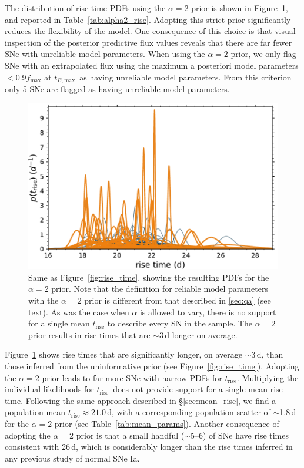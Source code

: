 \documentclass[twocolumn]{./aastex63}
\newcommand{\trise}{$t_\mathrm{rise}$}
\newcommand{\tbmax}{$t_{B,\mathrm{max}}$}
\begin{document}
The distribution of rise time PDFs using the $\alpha = 2$ prior is shown in
Figure~\ref{fig:tsquared_rise}, and reported in Table~\ref{tab:alpha2_rise}.
Adopting this strict prior significantly reduces the flexibility of the model.
One consequence of this choice is that visual inspection of the posterior
predictive flux values reveals that there are far fewer SNe with unreliable
model parameters. When using the $\alpha = 2$ prior, we only flag SNe with an
extrapolated flux using the maximum a posteriori model parameters $< 0.9
f_\mathrm{max}$ at \tbmax\ as having unreliable model parameters. From this
criterion only 5 SNe are flagged as having unreliable model parameters.



\begin{figure}
    \centering
    \includegraphics[width=1\linewidth]{./figures/tsquared_rise_time.pdf}
    \caption{Same as Figure~\ref{fig:rise_time}, showing the resulting PDFs
    for the $\alpha = 2$ prior. Note that the definition for reliable model
    parameters with the $\alpha = 2$ prior is different from that described in
    \ref{sec:qa} (see text). As was the case when $\alpha$ is allowed to vary,
    there is no support for a single mean $t_\mathrm{rise}$ to describe every
    SN in the sample. The $\alpha = 2$ prior results in rise times that are
    $\sim$3\,d longer on average.}
    \label{fig:tsquared_rise}
\end{figure}

Figure~\ref{fig:tsquared_rise} shows rise times that are significantly longer,
on average $\sim$3\,d, than those inferred from the uninformative prior (see
Figure~\ref{fig:rise_time}). Adopting the $\alpha = 2$ prior leads to far more
SNe with narrow PDFs for \trise. Multiplying the individual likelihoods for
\trise\ does not provide support for a single mean rise time. Following the
same approach described in \S\ref{sec:mean_rise}, we find a population mean
\trise\;$\approx 21.0$\,d, with a corresponding population scatter of
$\sim$1.8\,d for the $\alpha = 2$ prior (see Table~\ref{tab:mean_params}).
Another consequence of adopting the $\alpha = 2$ prior is that a small handful
($\sim$5--6) of SNe have rise times consistent with 26\,d, which is
considerably longer than the rise times inferred in any previous study of
normal SNe Ia.
\end{document}
